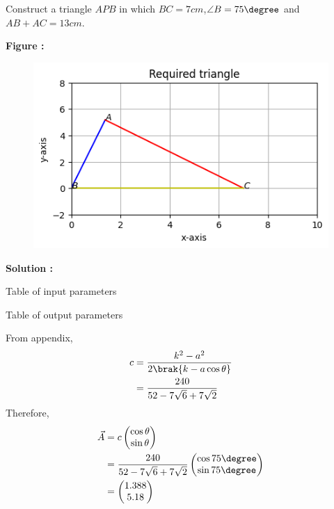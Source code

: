 Construct a triangle $APB$ in which $BC = 7cm$,$\angle B = 75\degree$ and $AB+AC = 13cm$.

\textbf{Figure :}
\begin{figure}[H]
    \centering
          \includegraphics[width=\columnwidth]{chapters/const/examples/figs/2.png}
    \caption{}
    \label{fig:fig:1}
\end{figure}

\textbf{Solution :}
\begin{table}[H]
    \centering
    
    \caption{Table of input parameters}
    \label{tab:tab:1}
\end{table} 
\begin{table}[H]
    \centering
    
  \caption{Table of output parameters}
    \label{tab:tab:2}
\end{table}


From appendix,
\begin{align}
    c&=\frac{k^2-a^2}{2\brak{k-a\cos{\theta}}}\\
    &=\frac{240}{52-7\sqrt{6}+7\sqrt{2}}
    \end{align}
Therefore,
\begin{align}
    \Vec{A}&=c\begin{pmatrix}
        \cos{\theta}\\\sin{\theta}
    \end{pmatrix}\\
    &=\frac{240}{52-7\sqrt{6}+7\sqrt{2}}\begin{pmatrix}
        \cos{75\degree}\\\sin{75\degree}
    \end{pmatrix}\\
    &=\begin{pmatrix}
        1.388\\5.18
    \end{pmatrix}\\
\end{align}
